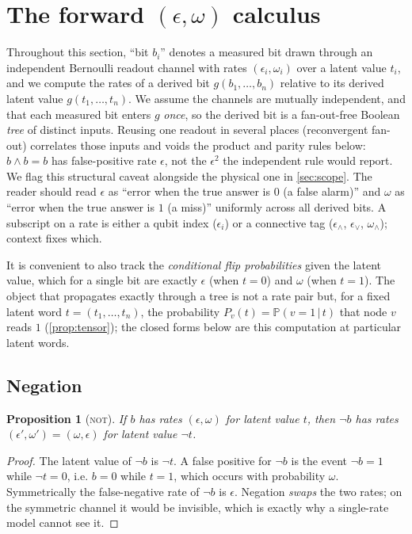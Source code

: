 \documentclass[11pt]{article}
\numberwithin{equation}{section}
\theoremstyle{plain}
\newtheorem{proposition}[theorem]{Proposition}
\theoremstyle{definition}
\theoremstyle{remark}
\newcommand{\eps}{\epsilon}
\newcommand{\Prob}{\mathbb{P}}
\newcommand{\given}{\,\vert\,}
\begin{document}
\section{The forward \texorpdfstring{$(\eps,\omega)$}{(epsilon, omega)} calculus}
\label{sec:calculus}

Throughout this section, ``bit $b_i$'' denotes a measured bit drawn through an
independent Bernoulli readout channel with rates $(\eps_i,\omega_i)$ over a
latent value $t_i$, and we compute the rates of a derived bit
$g(b_1,\dots,b_n)$ relative to its derived latent value $g(t_1,\dots,t_n)$. We
assume the channels are mutually independent, and that each measured bit enters
$g$ \emph{once}, so the derived bit is a fan-out-free Boolean \emph{tree} of
distinct inputs. Reusing one readout in several places (reconvergent fan-out)
correlates those inputs and voids the product and parity rules below: $b\wedge b
= b$ has false-positive rate $\eps$, not the $\eps^2$ the independent rule would
report. We flag this structural caveat alongside the physical one in
\cref{sec:scope}. The reader should read $\eps$ as
``error when the true answer is $0$ (a false alarm)'' and $\omega$ as ``error
when the true answer is $1$ (a miss)'' uniformly across all derived bits. A
subscript on a rate is either a qubit index ($\eps_i$) or a connective tag
($\eps_\wedge$, $\eps_\vee$, $\omega_\wedge$); context fixes which.

It is convenient to also track the \emph{conditional flip probabilities} given
the latent value, which for a single bit are exactly $\eps$ (when $t=0$) and
$\omega$ (when $t=1$). The object that propagates exactly through a tree is
not a rate pair but, for a fixed latent word $t=(t_1,\dots,t_n)$, the
probability $P_v(t)=\Prob(v=1\given t)$ that node $v$ reads $1$
(\cref{prop:tensor}); the closed forms below are this computation at
particular latent words.

\subsection{Negation}

\begin{proposition}[\textsc{not}]
\label{prop:not}
If $b$ has rates $(\eps,\omega)$ for latent value $t$, then $\lnot b$ has rates
$(\eps',\omega')=(\omega,\eps)$ for latent value $\lnot t$.
\end{proposition}

\begin{proof}
The latent value of $\lnot b$ is $\lnot t$. A false positive for $\lnot b$ is the
event $\lnot b=1$ while $\lnot t=0$, i.e. $b=0$ while $t=1$, which occurs with
probability $\omega$. Symmetrically the false-negative rate of $\lnot b$ is
$\eps$. Negation \emph{swaps} the two rates; on the symmetric channel it would be
invisible, which is exactly why a single-rate model cannot see it.
\end{proof}
\end{document}
